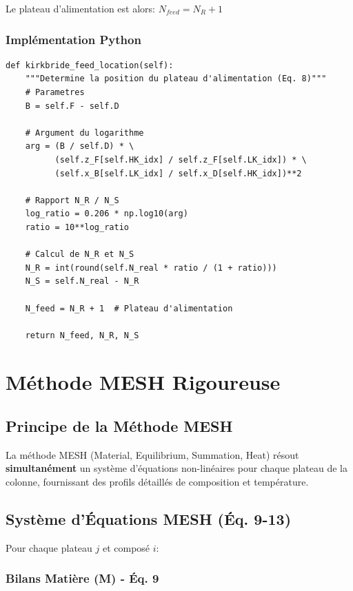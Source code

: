 \documentclass[11pt,a4paper]{article}
\begin{document}
Le plateau d'alimentation est alors: $N_{feed} = N_R + 1$

\subsubsection{Implémentation Python}

\begin{lstlisting}[caption=Méthode de Kirkbride dans distillation\_multicomposants.py]
def kirkbride_feed_location(self):
    """Determine la position du plateau d'alimentation (Eq. 8)"""
    # Parametres
    B = self.F - self.D

    # Argument du logarithme
    arg = (B / self.D) * \
          (self.z_F[self.HK_idx] / self.z_F[self.LK_idx]) * \
          (self.x_B[self.LK_idx] / self.x_D[self.HK_idx])**2

    # Rapport N_R / N_S
    log_ratio = 0.206 * np.log10(arg)
    ratio = 10**log_ratio

    # Calcul de N_R et N_S
    N_R = int(round(self.N_real * ratio / (1 + ratio)))
    N_S = self.N_real - N_R

    N_feed = N_R + 1  # Plateau d'alimentation

    return N_feed, N_R, N_S
\end{lstlisting}

\section{Méthode MESH Rigoureuse}

\subsection{Principe de la Méthode MESH}

La méthode MESH (Material, Equilibrium, Summation, Heat) résout \textbf{simultanément} un système d'équations non-linéaires pour chaque plateau de la colonne, fournissant des profils détaillés de composition et température.

\subsection{Système d'Équations MESH (Éq. 9-13)}

Pour chaque plateau $j$ et composé $i$:

\subsubsection{Bilans Matière (M) - Éq. 9}
\end{document}
